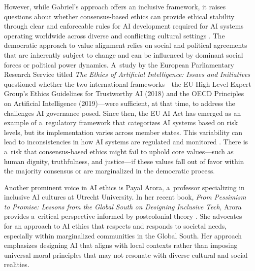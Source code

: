 \documentclass[%
  manuscript=article,
  year=2024,
  volume=77,
  doi=10.59203/zfn.77.707,
]{zfn}
\begin{document}
However, while Gabriel's approach offers an inclusive framework, it raises questions about whether consensus-based ethics can provide ethical stability through clear and enforceable rules for AI development required for AI systems operating worldwide across diverse and conflicting cultural settings 
\parencite[][]{correa_worldwide_2023}. %
 The democratic approach to value alignment relies on social and political agreements that are inherently subject to change and can be influenced by dominant social forces or political power dynamics. A~study by the European Parliamentary Research Service 
\parencite[][]{european_parliament_directorate_general_for_parliamentary_research_services_artificial_2020} %
 titled \textit{The Ethics of Artificial Intelligence: Issues and Initiatives} questioned whether the two international frameworks---the EU High-Level Expert Group's Ethics Guidelines for Trustworthy AI (2018) and the OECD Principles on Artificial Intelligence (2019)---were sufficient, at that time, to address the challenges AI governance posed. Since then, the EU AI Act has emerged as an example of a~regulatory framework that categorizes AI systems based on risk levels, but its implementation varies across member states. This variability can lead to inconsistencies in how AI systems are regulated and monitored 
\parencite[][]{formosa_ethics_2024}. %
 There is a~risk that consensus-based ethics might fail to uphold core values---such as human dignity, truthfulness, and justice---if these values fall out of favor within the majority consensus or are marginalized in the democratic process.



Another prominent voice in AI ethics is Payal Arora, a~professor specializing in inclusive AI cultures at Utrecht University. In her recent book, \textit{From Pessimism to Promise: Lessons from the Global South on Designing Inclusive Tech}, Arora provides a~critical perspective informed by postcolonial theory 
\parencite[][]{arora_pessimism_2024}. %
 She advocates for an approach to AI ethics that respects and responds to societal needs, especially within marginalized communities in the Global South. Her approach emphasizes designing AI that aligns with local contexts rather than imposing universal moral principles that may not resonate with diverse cultural and social realities.
\end{document}
